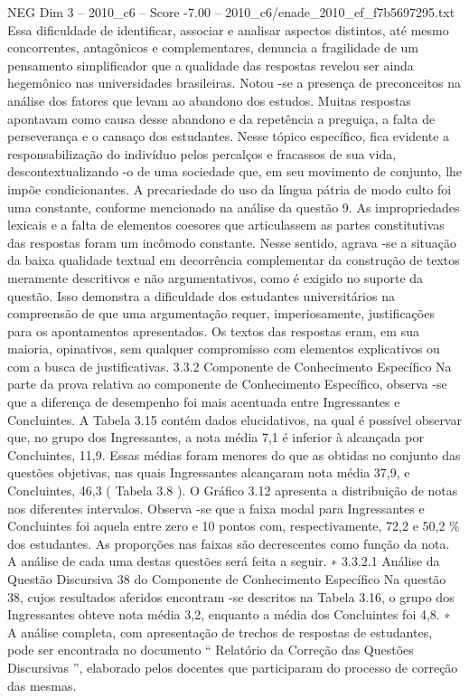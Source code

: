 \begin{textsample}{NEG Dim 3 – 2010\_c6 – Score -7.00 – 2010\_c6/enade\_2010\_ef\_f7b5697295.txt}
Essa dificuldade de identificar, associar e analisar aspectos distintos, até mesmo concorrentes, antagônicos e complementares, denuncia a fragilidade de um pensamento simplificador que a qualidade das respostas revelou ser ainda hegemônico nas universidades brasileiras.
Notou -se a presença de preconceitos na análise dos fatores que levam ao abandono dos estudos.
Muitas respostas apontavam como causa desse abandono e da repetência a preguiça, a falta de perseverança e o cansaço dos estudantes.
Nesse tópico específico, fica evidente a responsabilização do indivíduo pelos percalços e fracassos de sua vida, descontextualizando -o de uma sociedade que, em seu movimento de conjunto, lhe impõe condicionantes.
A precariedade do uso da língua pátria de modo culto foi uma constante, conforme mencionado na análise da questão 9.
As impropriedades lexicais e a falta de elementos coesores que articulassem as partes constitutivas das respostas foram um incômodo constante.
Nesse sentido, agrava -se a situação da baixa qualidade textual em decorrência complementar da construção de textos meramente descritivos e não argumentativos, como é exigido no suporte da questão.
Isso demonstra a dificuldade dos estudantes universitários na compreensão de que uma argumentação requer, imperiosamente, justificações para os apontamentos apresentados.
Os textos das respostas eram, em sua maioria, opinativos, sem qualquer compromisso com elementos explicativos ou com a busca de justificativas. 3.3.2 Componente de Conhecimento Específico Na parte da prova relativa ao componente de Conhecimento Específico, observa -se que a diferença de desempenho foi mais acentuada entre Ingressantes e Concluintes.
A Tabela 3.15 contém dados elucidativos, na qual é possível observar que, no grupo dos Ingressantes, a nota média 7,1 é inferior à alcançada por Concluintes, 11,9.
Essas médias foram menores do que as obtidas no conjunto das questões objetivas, nas quais Ingressantes alcançaram nota média 37,9, e Concluintes, 46,3 ( Tabela 3.8 ).
O Gráfico 3.12 apresenta a distribuição de notas nos diferentes intervalos.
Observa -se que a faixa modal para Ingressantes e Concluintes foi aquela entre zero e 10 pontos com, respectivamente, 72,2 e 50,2 \% dos estudantes.
As proporções nas faixas são decrescentes como função da nota.
A análise de cada uma destas questões será feita a seguir. ∗ 3.3.2.1 Análise da Questão Discursiva 38 do Componente de Conhecimento Específico Na questão 38, cujos resultados aferidos encontram -se descritos na Tabela 3.16, o grupo dos Ingressantes obteve nota média 3,2, enquanto a média dos Concluintes foi 4,8. ∗ A análise completa, com apresentação de trechos de respostas de estudantes, pode ser encontrada no documento “ Relatório da Correção das Questões Discursivas ”, elaborado pelos docentes que participaram do processo de correção das mesmas.

\end{textsample}
